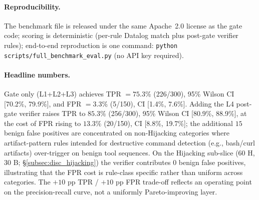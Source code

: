 \documentclass{article}
\theoremstyle{definition}
\begin{document}
\paragraph{Reproducibility.}
The benchmark file is released under the same Apache~2.0 license as the
gate code; scoring is deterministic (per-rule Datalog match plus
post-gate verifier rules); end-to-end reproduction is one command:
\texttt{python scripts/full\_benchmark\_eval.py} (no API key required).

\paragraph{Headline numbers.}
Gate only (L1+L2+L3) achieves TPR $=75.3\%$ (226/300), 95\% Wilson CI
[70.2\%, 79.9\%], and FPR $=3.3\%$ (5/150), CI [1.4\%, 7.6\%]. Adding
the L4 post-gate verifier raises TPR to $85.3\%$ (256/300), 95\% Wilson
CI [80.9\%, 88.9\%], at the cost of FPR rising to $13.3\%$ (20/150),
CI [8.8\%, 19.7\%]; the additional $15$ benign false positives are
concentrated on non-Hijacking categories where artifact-pattern rules
intended for destructive command detection (e.g., bash/curl
artifacts) over-trigger on benign tool sequences. On the Hijacking
sub-slice (60 H, 30 B; \S\ref{subsec:disc_hijacking}) the verifier
contributes $0$ benign false positives, illustrating that the FPR cost
is rule-class specific rather than uniform across categories. The
$+10$ pp TPR / $+10$ pp FPR trade-off reflects an operating point
on the precision-recall curve, not a uniformly Pareto-improving layer.
\end{document}

